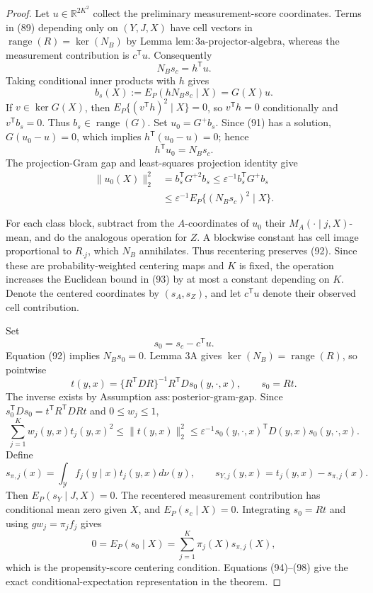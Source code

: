 \documentclass{article}
\begin{document}
\begin{proof}
Let \(u\in\mathbb R^{2K^2}\) collect the preliminary measurement-score coordinates.  Terms in (89) depending only on \((Y,J,X)\) have cell vectors in
\(\operatorname{range}(R)=\ker(N_B)\) by Lemma \(\mathrm{lem{:}3a\mbox{-}projector\mbox{-}algebra}\), whereas the measurement contribution is \(c^{\mathsf T}u\).  Consequently
\[
 N_Bs_c=h^{\mathsf T}u. \tag{90}
\]
Taking conditional inner products with \(h\) gives
\[
 b_s(X):=E_P(hN_Bs_c\mid X)=G(X)u. \tag{91}
\]
If \(v\in\ker G(X)\), then \(E_P\{(v^{\mathsf T}h)^2\mid X\}=0\), so \(v^{\mathsf T}h=0\) conditionally and \(v^{\mathsf T}b_s=0\).  Thus \(b_s\in\operatorname{range}(G)\).  Set \(u_0=G^+b_s\).  Since (91) has a solution, \(G(u_0-u)=0\), which implies \(h^{\mathsf T}(u_0-u)=0\); hence
\[
 h^{\mathsf T}u_0=N_Bs_c. \tag{92}
\]
The projection-Gram gap and least-squares projection identity give
\[
\begin{aligned}
 \|u_0(X)\|_2^2
 &=b_s^{\mathsf T}G^{+2}b_s
 \leq\varepsilon^{-1}b_s^{\mathsf T}G^+b_s\\
 &\leq\varepsilon^{-1}E_P\{(N_Bs_c)^2\mid X\}. \tag{93}
\end{aligned}
\]

For each class block, subtract from the \(A\)-coordinates of \(u_0\) their \(M_A(\cdot\mid j,X)\)-mean, and do the analogous operation for \(Z\).  A blockwise constant has cell image proportional to \(R_{\cdot j}\), which \(N_B\) annihilates.  Thus recentering preserves (92).  Since these are probability-weighted centering maps and \(K\) is fixed, the operation increases the Euclidean bound in (93) by at most a constant depending on \(K\).  Denote the centered coordinates by \((s_A,s_Z)\), and let \(c^{\mathsf T}u\) denote their observed cell contribution.

Set
\[
 s_0=s_c-c^{\mathsf T}u. \tag{94}
\]
Equation (92) implies \(N_Bs_0=0\).  Lemma 3A gives
\(\ker(N_B)=\operatorname{range}(R)\), so pointwise
\[
 t(y,x)=\{R^{\mathsf T}DR\}^{-1}R^{\mathsf T}D
 s_0(y,\cdot,x),\qquad s_0=Rt. \tag{95}
\]
The inverse exists by Assumption \(\mathrm{ass{:}posterior\mbox{-}gram\mbox{-}gap}\).  Since
\(s_0^{\mathsf T}Ds_0=t^{\mathsf T}R^{\mathsf T}DRt\) and \(0\leq w_j\leq1\),
\[
 \sum_{j=1}^Kw_j(y,x)t_j(y,x)^2
 \leq\|t(y,x)\|_2^2
 \leq\varepsilon^{-1}s_0(y,\cdot,x)^{\mathsf T}D(y,x)s_0(y,\cdot,x). \tag{96}
\]
Define
\[
 s_{\pi,j}(x)=\int_{\mathcal Y}f_j(y\mid x)t_j(y,x)d\nu(y),
 \qquad
 s_{Y,j}(y,x)=t_j(y,x)-s_{\pi,j}(x). \tag{97}
\]
Then \(E_P(s_Y\mid J,X)=0\).  The recentered measurement contribution has conditional mean zero given \(X\), and \(E_P(s_c\mid X)=0\).  Integrating \(s_0=Rt\) and using \(gw_j=\pi_jf_j\) gives
\[
 0=E_P(s_0\mid X)=\sum_{j=1}^K\pi_j(X)s_{\pi,j}(X), \tag{98}
\]
which is the propensity-score centering condition.  Equations (94)--(98) give the exact conditional-expectation representation in the theorem.


\end{proof}
\end{document}
